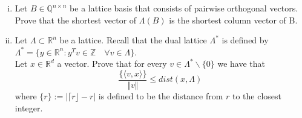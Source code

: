 \documentclass{article}
\def\RR{\mathbb{R}}
\begin{document}
\begin{enumerate}[i)]
\item 
Let $B \in \mathbb{Q}^{n\times n}$ be a lattice basis that consists of pairwise orthogonal vectors. Prove that the shortest vector of $\Lambda(B)$ is the shortest column vector of B.

\item 
Let $\Lambda \subset \RR^n$ be a lattice. Recall that the dual lattice $\Lambda^\ast$ is defined by $\Lambda^\ast = \{ y \in \mathbb{R}^n : y^Tv \in \mathbb{Z} \quad \forall v \in \Lambda\}$. \\
Let $x \in \RR^d$ a vector. Prove that for every $v \in \Lambda^\ast \backslash \{0\}$ we have that  
$$\frac{\{\langle v, x \rangle \}}{\Vert v \Vert} \leq dist(x, \Lambda)$$
where $\{r\} := |\lceil r \rfloor - r|$ is defined to be the distance from $r$ to the closest integer.
\end{enumerate}

    
\end{document}
